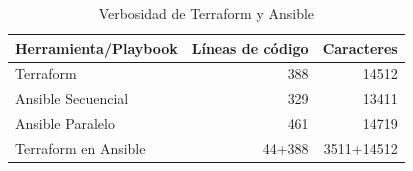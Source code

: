 \documentclass[11pt]{article}
\begin{document}
\begin{flushleft}
\begin{table}[h!]
    \centering
    \begin{tabular}{| l | r | r |}
        \hline
        \textbf{Herramienta/Playbook}     & \textbf{Líneas de código}  & \textbf{Caracteres} \\
        \hline
        \hline
        
        Terraform                         & 388                        & 14512               \\
        \hline
        Ansible Secuencial                & 329                        & 13411               \\
        \hline
        Ansible Paralelo                  & 461                        & 14719               \\
        \hline
        Terraform en Ansible              & 44+388                    & 3511+14512           \\
        \hline

    \end{tabular}
    \caption{Verbosidad de Terraform y Ansible}
    \label{verbosidad_todos}
\end{table}
















\end{flushleft}

\clearpage
\printbibliography[heading=bibintoc, title={Bibliografía}]
\end{document}
